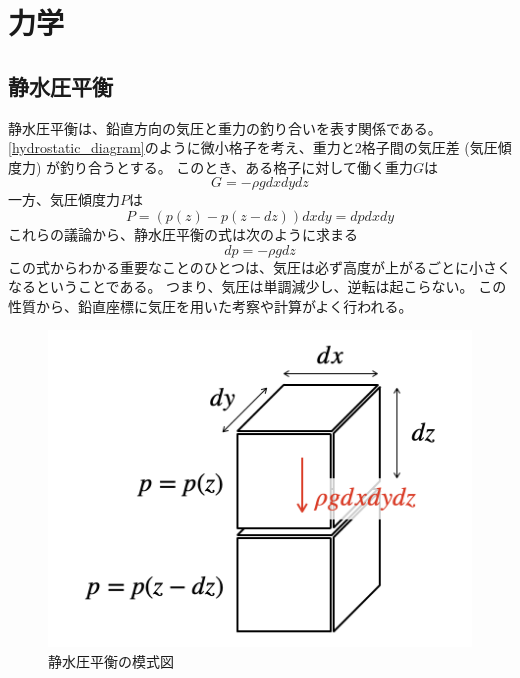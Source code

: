 \documentclass[a4paper,11pt,platex]{jsarticle}
\numberwithin{equation}{section}
\begin{document}
\section{力学}


\subsection{静水圧平衡}
静水圧平衡は、鉛直方向の気圧と重力の釣り合いを表す関係である。
\autoref{hydrostatic_diagram}のように微小格子を考え、重力と2格子間の気圧差 (気圧傾度力) が釣り合うとする。
このとき、ある格子に対して働く重力$G$は
\begin{equation}
    G = -\rho g dx dy dz
\end{equation}
一方、気圧傾度力$P$は
\begin{equation}
    P = \left(p\left(z\right) - p\left(z-dz\right)\right) dx dy = dp dx dy
\end{equation}
これらの議論から、静水圧平衡の式は次のように求まる
\begin{equation}
    \label{hydrostatic_balance}
    dp = -\rho g dz
\end{equation}
この式からわかる重要なことのひとつは、気圧は必ず高度が上がるごとに小さくなるということである。
つまり、気圧は単調減少し、逆転は起こらない。
この性質から、鉛直座標に気圧を用いた考察や計算がよく行われる。
\begin{figure}[t]
    \centering
    \includegraphics[scale=0.5]{figs/hydrostatic_diagram.png}
    \caption{静水圧平衡の模式図}
    \label{hydrostatic_diagram}
\end{figure}
\end{document}
